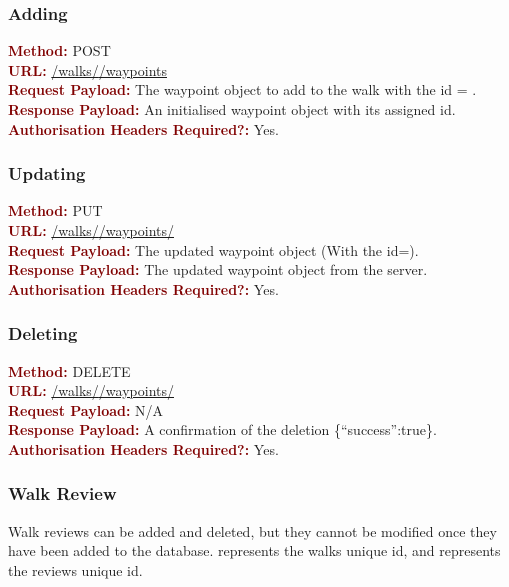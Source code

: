 \documentclass[11pt,a4paper]{report}
\begin{document}
\subsubsection{Adding}
\textbf{\textcolor{Maroon}{Method:}} POST\\
\textbf{\textcolor{Maroon}{URL:}} \url{/walks/}\url{/waypoints}\\
\textbf{\textcolor{Maroon}{Request Payload:}} The waypoint object to add to the walk with the id = .\\
\textbf{\textcolor{Maroon}{Response Payload:}} An initialised waypoint object with its assigned id.\\
\textbf{\textcolor{Maroon}{Authorisation Headers Required?:}} Yes.

\subsubsection{Updating}
\textbf{\textcolor{Maroon}{Method:}} PUT\\
\textbf{\textcolor{Maroon}{URL:}} \url{/walks/}\url{/waypoints/}\\
\textbf{\textcolor{Maroon}{Request Payload:}} The updated waypoint object (With the id=).\\
\textbf{\textcolor{Maroon}{Response Payload:}} The updated waypoint object from the server.\\
\textbf{\textcolor{Maroon}{Authorisation Headers Required?:}} Yes.

\subsubsection{Deleting}
\textbf{\textcolor{Maroon}{Method:}} DELETE\\
\textbf{\textcolor{Maroon}{URL:}} \url{/walks/}\url{/waypoints/}\\
\textbf{\textcolor{Maroon}{Request Payload:}} N/A\\
\textbf{\textcolor{Maroon}{Response Payload:}} A confirmation of the deletion \{``success'':true\}.\\
\textbf{\textcolor{Maroon}{Authorisation Headers Required?:}} Yes.

\subsubsection{Walk Review}

Walk reviews can be added and deleted, but they cannot be modified once they have been added to the database.  represents the walks unique id, and  represents the reviews unique id.
\end{document}
